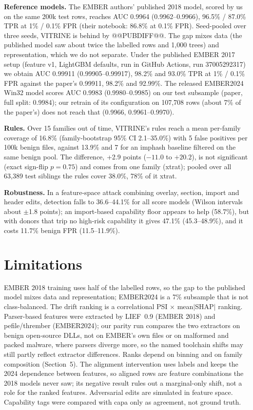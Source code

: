 \documentclass[10pt]{article}
\begin{document}
\textbf{Reference models.} The EMBER authors' published 2018 model, scored by us on the same 200k test
rows, reaches AUC 0.9964 (0.9962--0.9966), 96.5\% / 87.0\% TPR at 1\% / 0.1\% FPR (their notebook:
86.8\% at 0.1\% FPR). Seed-pooled over three seeds, VITRINE is behind by @@PUBDIFF@@. The gap mixes data
(the published model saw about twice the labelled rows and 1{,}000 trees) and representation, which we
do not separate. Under the published EMBER 2017 setup (feature v1, LightGBM defaults, run in GitHub
Actions, run 37005292317) we obtain AUC 0.99911 (0.99905--0.99917), 98.2\% and 93.0\% TPR at 1\% /
0.1\% FPR against the paper's 0.99911, 98.2\% and 92.99\%. The released EMBER2024 Win32 model scores
AUC 0.9983 (0.9980--0.9985) on our test subsample (paper, full split: 0.9984); our retrain of its
configuration on 107{,}708 rows (about 7\% of the paper's) does not reach that (0.9966, 0.9961--0.9970).

\textbf{Rules.} Over 15 families out of time, VITRINE's rules reach a mean per-family coverage of
16.8\% (family-bootstrap 95\% CI 2.1--35.0\%) with 5 false positives per 100k benign files, against
13.9\% and 7 for an imphash baseline filtered on the same benign pool. The difference, +2.9 points
($-11.0$ to $+20.2$), is not significant (exact sign-flip $p = 0.75$) and comes from one family
(xtrat); pooled over all 63{,}389 test siblings the rules cover 38.0\%, 78\% of it xtrat.

\textbf{Robustness.} In a feature-space attack combining overlay, section, import and header edits,
detection falls to 36.6--44.1\% for all score models (Wilson intervals about $\pm$1.8 points); an
import-based capability floor appears to help (58.7\%), but with donors that trip no high-risk
capability it gives 47.1\% (45.3--48.9\%), and it costs 11.7\% benign FPR (11.5--11.9\%).

\section{Limitations}
EMBER 2018 training uses half of the labelled rows, so the gap to the published model mixes data and
representation; EMBER2024 is a 7\% subsample that is not class-balanced. The drift ranking is a
correlational PSI $\times$ mean$|$SHAP$|$ ranking. Parser-based features were extracted by LIEF~0.9
(EMBER 2018) and pefile/thrember (EMBER2024); our parity run compares the two extractors on benign
open-source DLLs, not on EMBER's own files or on malformed and packed malware, where parsers diverge
more, so the named toolchain shifts may still partly reflect extractor differences. Ranks depend on
binning and on family composition (Section~5). The alignment intervention uses labels and keeps the
2024 dependence between features, so aligned rows are feature combinations the 2018 models never saw;
its negative result rules out a marginal-only shift, not a role for the ranked features. Adversarial
edits are simulated in feature space. Capability tags were compared with capa only as agreement, not
ground truth.
\end{document}
